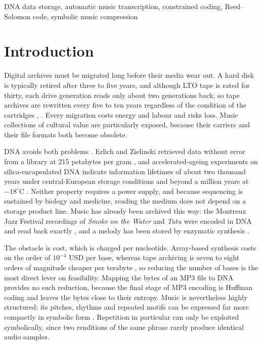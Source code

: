 \documentclass[conference]{IEEEtran}
\begin{document}
\begin{IEEEkeywords}
DNA data storage, automatic music transcription, constrained coding, Reed--Solomon code, symbolic music compression
\end{IEEEkeywords}

\section{Introduction}

Digital archives must be migrated long before their media wear out. A hard disk is typically retired after three to five years, and although LTO tape is rated for thirty, each drive generation reads only about two generations back, so tape archives are rewritten every five to ten years regardless of the condition of the cartridges \cite{dong}, \cite{lto}. Every migration costs energy and labour and risks loss. Music collections of cultural value are particularly exposed, because their carriers and their file formats both become obsolete.

DNA avoids both problems \cite{shomorony}. Erlich and Zielinski retrieved data without error from a library at 215 petabytes per gram \cite{erlich}, and accelerated-ageing experiments on silica-encapsulated DNA indicate information lifetimes of about two thousand years under central-European storage conditions and beyond a million years at $-18^\circ$C \cite{grass}. Neither property requires a power supply, and because sequencing is sustained by biology and medicine, reading the medium does not depend on a storage product line. Music has already been archived this way: the Montreux Jazz Festival recordings of \textit{Smoke on the Water} and \textit{Tutu} were encoded in DNA and read back exactly \cite{dufaux}, and a melody has been stored by enzymatic synthesis \cite{lee}.

The obstacle is cost, which is charged per nucleotide. Array-based synthesis costs on the order of $10^{-4}$ USD per base, whereas tape archiving is seven to eight orders of magnitude cheaper per terabyte \cite{yu}, so reducing the number of bases is the most direct lever on feasibility. Mapping the bytes of an MP3 file to DNA provides no such reduction, because the final stage of MP3 encoding is Huffman coding and leaves the bytes close to their entropy. Music is nevertheless highly structured: its pitches, rhythms and repeated motifs can be expressed far more compactly in symbolic form \cite{benetos}. Repetition in particular can only be exploited symbolically, since two renditions of the same phrase rarely produce identical audio samples.
\end{document}
